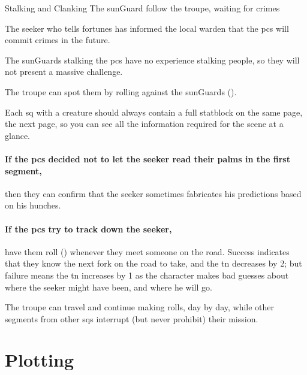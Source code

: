 \begin{multicols}{2}
{Stalking and Clanking}%
{The \gls{sunGuard} follow the troupe, waiting for crimes}%

\begin{exampletext}
  The \gls{seeker} who tells fortunes has informed the local \gls{warden} that the \glspl{pc} will commit crimes in the future.
\end{exampletext}

The \glspl{sunGuard} stalking the \glspl{pc} have no experience stalking people, so they will not present a massive challenge.


The troupe can spot them by rolling  against the \glspl{sunGuard}  (\tn).

Each \gls{sq} with a creature should always contain a full statblock on the same page, the next page, so you can see all the information required for the scene at a glance.

\paragraph{If the \glspl{pc} decided not to let the \gls{seeker} read their palms in the first \gls{segment},}
then they can confirm that the \gls{seeker} sometimes fabricates his predictions based on his hunches.

\paragraph{If the \glspl{pc} try to track down the \gls{seeker},}
have them roll  (\tn[12]) whenever they meet someone on the road.
Success indicates that they know the next fork on the road to take, and the \gls{tn} decreases by 2; but failure means the \gls{tn} increases by 1 as the character makes bad guesses about where the \gls{seeker} might have been, and where he will go.

The troupe can travel and continue making rolls, day by day, while other \glspl{segment} from other \glspl{sq} interrupt (but never prohibit) their mission.

\end{multicols}

\section{Plotting }

